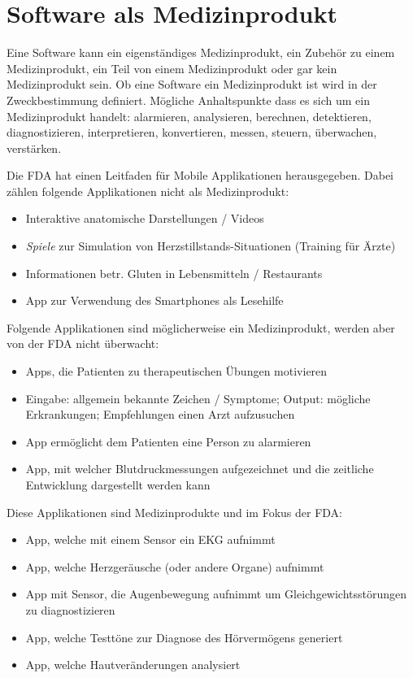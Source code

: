 \chapter{Software als Medizinprodukt}

Eine Software kann ein eigenständiges Medizinprodukt, ein Zubehör zu einem Medizinprodukt, ein Teil von einem Medizinprodukt oder gar kein Medizinprodukt sein. Ob eine Software ein Medizinprodukt ist wird in der Zweckbestimmung definiert. Mögliche Anhaltspunkte dass es sich um ein Medizinprodukt handelt: alarmieren, analysieren, berechnen, detektieren, diagnostizieren, interpretieren, konvertieren, messen, steuern, überwachen, verstärken.

Die FDA hat einen Leitfaden für Mobile Applikationen herausgegeben. Dabei zählen folgende Applikationen nicht als Medizinprodukt:
\begin{itemize}
	\item Interaktive anatomische Darstellungen / Videos
	\item \textit{Spiele} zur Simulation von Herzstillstands-Situationen (Training für Ärzte)
	\item Informationen betr. Gluten in Lebensmitteln / Restaurants
	\item App zur Verwendung des Smartphones als Lesehilfe
\end{itemize}
Folgende Applikationen sind möglicherweise ein Medizinprodukt, werden aber von der FDA nicht überwacht:
\begin{itemize}
	\item Apps, die Patienten zu therapeutischen Übungen motivieren
	\item Eingabe: allgemein bekannte Zeichen / Symptome; Output: mögliche Erkrankungen; Empfehlungen einen Arzt aufzusuchen
	\item App ermöglicht dem Patienten eine Person zu alarmieren
	\item App, mit welcher Blutdruckmessungen aufgezeichnet und die zeitliche Entwicklung dargestellt werden kann
\end{itemize}
Diese Applikationen sind Medizinprodukte und im Fokus der FDA:
\begin{itemize}
	\item App, welche mit einem Sensor ein EKG aufnimmt
	\item App, welche Herzgeräusche (oder andere Organe) aufnimmt
	\item App mit Sensor, die Augenbewegung aufnimmt um Gleichgewichtsstörungen zu diagnostizieren
	\item App, welche Testtöne zur Diagnose des Hörvermögens generiert
	\item App, welche Hautveränderungen analysiert
\end{itemize}
